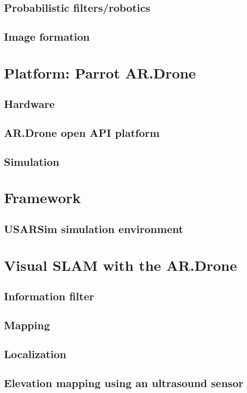 \documentclass[twoside]{uva-bachelor-thesis}
\begin{document}
	\section{Probabilistic filters/robotics}
	\section{Image formation}

\chapter{Platform: Parrot AR.Drone}
	\section{Hardware}
	\section{AR.Drone open API platform}
	\section{Simulation}

\chapter{Framework}
	\section{USARSim simulation environment}


\chapter{Visual SLAM with the AR.Drone}
	\section{Information filter}
	\section{Mapping}
	\section{Localization}
	\section{Elevation mapping using an ultrasound sensor}
\end{document}
